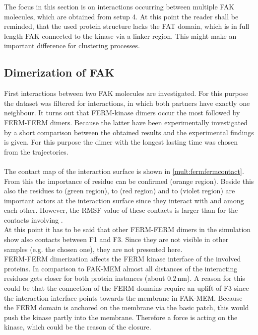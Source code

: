 \label{multiProt}
The focus in this section is on interactions occurring between multiple FAK molecules, which are obtained from setup 4. At this point the reader shall be reminded, that the used protein structure lacks the FAT domain, which is in full length FAK connected to the kinase via a linker region. This might make an important difference for clustering processes.
\subsection{Dimerization of FAK}
\label{mult:dimers}
First interactions between two FAK molecules are investigated. For this purpose the dataset was filtered for interactions, in which both partners have exactly one neighbour. It turns out that FERM-kinase dimers occur the most followed by FERM-FERM dimers. Because the latter have been experimentally investigated by \textcite{fakdimers} a short comparison between the obtained results and the experimental findings is given. For this purpose the dimer with the longest lasting time was chosen from the trajectories.\\ %
\\
The contact map of the interaction surface is shown in \autoref{mult:fermfermcontact}. From this the importance of residue  can be confirmed (orange region). Beside this also the residues  to  (green region),  to  (red region) and  to  (violet region) are important actors at the interaction surface since they interact with  and among each other. However, the RMSF value of these contacts is larger than for the contacts involving .\\
At this point it has to be said that other FERM-FERM dimers in the simulation show also contacts between F1 and F3. Since they are not visible in other samples (e.g. the chosen one), they are not presented here.\\
FERM-FERM dimerization affects the FERM kinase interface of the involved proteins. In comparison to FAK-MEM almost all distances of the interacting residues gets closer for both protein instances (about $0.2\,\si{\nano\metre}$). A reason for this could be that the connection of the FERM domains require an uplift of F3 since the interaction interface points towards the membrane in FAK-MEM. Because the FERM domain is anchored on the membrane via the basic patch, this would push the kinase partly into the membrane. Therefore a force is acting on the kinase, which could be the reason of the closure. %
